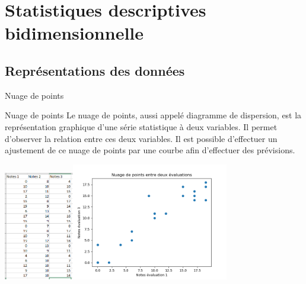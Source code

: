 \documentclass[10pt, french]{beamer}
\begin{document}
\section{Statistiques descriptives bidimensionnelle}
\subsection{Représentations des données}
\begin{frame}{Nuage de points}
\begin{block}{Nuage de points}
Le nuage de points, aussi appelé diagramme de dispersion, est la représentation graphique d'une série statistique à deux variables. Il permet d'observer la relation entre ces deux variables. Il est possible d'effectuer un ajustement de ce nuage de points par une courbe afin d'effectuer des prévisions.
\end{block}
\includegraphics[width=1.2in]{Images/data.png}\includegraphics[width=2.7in]{Images/nuage_note.png}
\end{frame}
\end{document}
